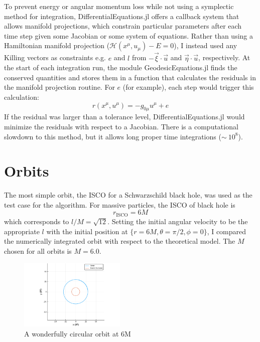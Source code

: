 \documentclass[%
preprint,
onecolumn,
amsmath,amssymb,
aps,
]{revtex4-1}
\numberwithin{equation}{section}
\begin{document}
    To prevent energy or angular momentum loss while not using a symplectic method for integration, DifferentialEquations.jl offers a callback system that allows manifold projections, which constrain particular parameters after each time step given some Jacobian or some system of equations. Rather than using a Hamiltonian manifold projection ($\mathcal{H}(x^\mu, u_\mu) - E = 0$), I instead used any Killing vectors as constraints e.g. $e$ and $l$ from $-\vec{\xi}\cdot\vec{u}$ and $\vec{\eta}\cdot\vec{u}$, respectively. At the start of each integration run, the module GeodesicEquations.jl finds the conserved quantities and stores them in a function that calculates the residuals in the manifold projection routine. For $e$ (for example), each step would trigger this calculation: \[r(x^{\mu}, u^{\mu}) = -g_{0\mu}u^{\mu} + e\] If the residual was larger than a tolerance level, DifferentialEquations.jl would minimize the residuals with respect to a Jacobian. There is a computational slowdown to this method, but it allows long proper time integrations ($\sim\ 10^8$).

    \section{\label{sec:orbits} Orbits}

    The most simple orbit, the ISCO for a Schwarzschild black hole, was used as the test case for the algorithm. For massive particles, the ISCO of black hole is \[r_{\text{ISCO}} = 6M\] which corresponds to $l/M = \sqrt{12}$. Setting the initial angular velocity to be the appropriate $l$ with the initial position at $\{r = 6M, \theta = \pi/2, \phi = 0\}$, I compared the numerically integrated orbit with respect to the theoretical model. The $M$ chosen for all orbits is $M=6.0$.     
    
    \begin{figure}[h!]
        \centering
        \includegraphics[width=0.45\textwidth]{images/circleorbit.png}
        \caption{A wonderfully circular orbit at 6M}
        \label{fig:circle}
    \end{figure}
    
\end{document}
